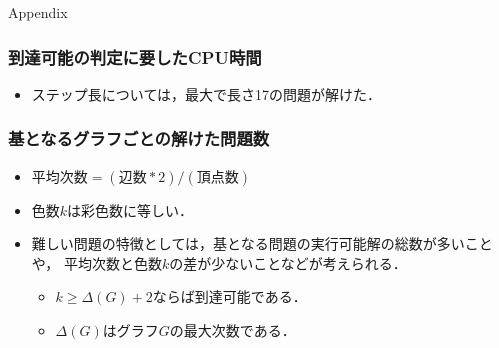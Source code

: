 \appendix
\backupbegin
\begin{frame}{}
  \begin{center}\Huge
    Appendix
  \end{center}
\end{frame}
\begin{frame}
  \frametitle{到達可能の判定に要したCPU時間}

  \begin{exampleblock}{}
    \centering
    \scalebox{0.75}{}
  \end{exampleblock}
  \begin{itemize}
    \item ステップ長については，最大で長さ17の問題が解けた．
  \end{itemize}
\end{frame}
\begin{frame}
  \frametitle{基となるグラフごとの解けた問題数}
  
  \begin{exampleblock}{}
    \centering
    \scalebox{0.8}{}
  \end{exampleblock}
  \begin{itemize}
    \item $\textrm{平均次数} = (\textrm{辺数}*2) / (\textrm{頂点数})$
    \item 色数$k$は彩色数に等しい．
    \item 難しい問題の特徴としては，基となる問題の実行可能解の総数が多いことや，
      平均次数と色数$k$の差が少ないことなどが考えられる．
      \begin{itemize}
        \item $k \ge \Delta(G) + 2$ならば到達可能である．
        \item $\Delta(G)$はグラフ$G$の最大次数である．
      \end{itemize}
  \end{itemize}
\end{frame}
